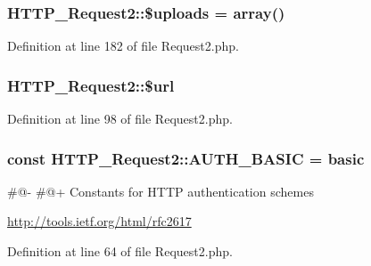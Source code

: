 \subsubsection[{\$uploads}]{\setlength{\rightskip}{0pt plus 5cm}H\+T\+T\+P\+\_\+\+Request2\+::\$uploads = array()\hspace{0.3cm}{\ttfamily [protected]}}\label{classHTTP__Request2_ad95bfff299ff890d4f554754428337e5}


Definition at line 182 of file Request2.\+php.

\hypertarget{classHTTP__Request2_acf16b4d76ebd04a80dc8e140303ad895}{}
\subsubsection[{\$url}]{\setlength{\rightskip}{0pt plus 5cm}H\+T\+T\+P\+\_\+\+Request2\+::\$url\hspace{0.3cm}{\ttfamily [protected]}}\label{classHTTP__Request2_acf16b4d76ebd04a80dc8e140303ad895}


Definition at line 98 of file Request2.\+php.

\hypertarget{classHTTP__Request2_a2282d82f67f929d936b2b2b6c2317dd1}{}
\subsubsection[{A\+U\+T\+H\+\_\+\+B\+A\+S\+I\+C}]{\setlength{\rightskip}{0pt plus 5cm}const H\+T\+T\+P\+\_\+\+Request2\+::\+A\+U\+T\+H\+\_\+\+B\+A\+S\+I\+C = \textquotesingle{}basic\textquotesingle{}}\label{classHTTP__Request2_a2282d82f67f929d936b2b2b6c2317dd1}
\#@-\/ \#@+ Constants for H\+T\+T\+P authentication schemes

\hyperlink{}{http\+://tools.\+ietf.\+org/html/rfc2617}

Definition at line 64 of file Request2.\+php.

\hypertarget{classHTTP__Request2_a4b05b6842e05183dc3ac3c7ff613b3c7}{}
